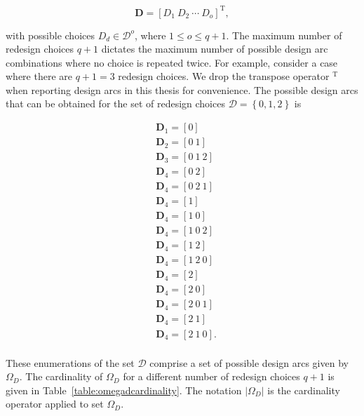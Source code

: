 \begin{equation} \label{eq:designarc}
	\mathbf{D} = \left[D_1 ~ D_2 ~ \cdots ~ D_o\right]^{\mathrm{T}},
\end{equation}

with possible choices $D_d \in \mathcal{D}^o$, where $1 \leq o \leq q+1$. The maximum number of redesign choices $q + 1$ dictates the maximum number of possible design arc combinations where no choice is repeated twice. For example, consider a case where there are $q + 1 = 3$ redesign choices. We drop the transpose operator $^{\mathrm{T}}$ when reporting design arcs in this thesis for convenience. The possible design arcs that can be obtained for the set of redesign choices $\mathcal{D} = \left\{0,1,2\right\}$ is

\begin{equation*}
	\begin{aligned}
		& \mathbf{D}_1 = \left[0\right]\\
		& \mathbf{D}_2 = \left[0 ~ 1\right]\\
		& \mathbf{D}_3 = \left[0 ~ 1 ~ 2\right]\\
		& \mathbf{D}_4 = \left[0 ~ 2\right]\\
		& \mathbf{D}_4 = \left[0 ~ 2 ~ 1\right]\\
		& \mathbf{D}_4 = \left[1\right]\\
		& \mathbf{D}_4 = \left[1 ~ 0\right]\\
		& \mathbf{D}_4 = \left[1 ~ 0 ~ 2\right]\\
		& \mathbf{D}_4 = \left[1 ~ 2\right]\\
		& \mathbf{D}_4 = \left[1 ~ 2 ~ 0\right]\\
		& \mathbf{D}_4 = \left[2\right]\\
		& \mathbf{D}_4 = \left[2 ~ 0\right]\\
		& \mathbf{D}_4 = \left[2 ~ 0 ~ 1\right]\\
		& \mathbf{D}_4 = \left[2 ~ 1\right]\\
		& \mathbf{D}_4 = \left[2 ~ 1 ~ 0\right].\\
	\end{aligned}
\end{equation*}

These enumerations of the set $\mathcal{D}$ comprise a set of possible design arcs given by $\Omega_D$. The cardinality of $\Omega_D$ for a different number of redesign choices $q+1$ is given in Table~\ref{table:omegadcardinality}. The notation $|\Omega_D|$ is the cardinality operator applied to set $\Omega_D$.

